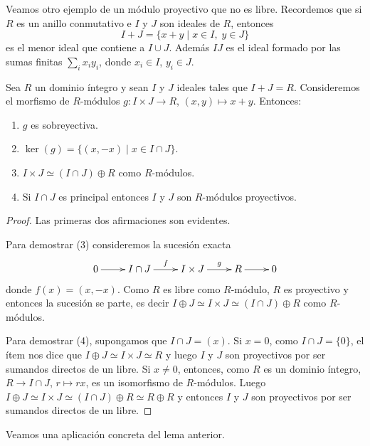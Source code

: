 Veamos otro ejemplo de un módulo proyectivo que no es libre. Recordemos
que si $R$ es un anillo conmutativo e $I$ y $J$ son ideales de $R$, entonces
	\[
		I+J=\{x+y\mid x\in I,\;y\in J\}
	\]
es el menor ideal que contiene a $I\cup J$. Además $IJ$ es el ideal formado
por las sumas finitas $\sum_i x_iy_i$, donde $x_i\in I$, $y_i\in J$. 

	\begin{lemma}
		Sea $R$ un dominio íntegro y sean $I$ y $J$ ideales tales que
		$I+J=R$. Consideremos el morfismo de $R$-módulos 
		$g\colon I\times J\to R$, $(x,y)\mapsto x+y$. 
		Entonces:
		\begin{enumerate}
			\item $g$ es sobreyectiva.
			\item $\ker(g)=\{(x,-x)\mid x\in I\cap J\}$.
			\item $I\times J\simeq (I\cap J)\oplus R$ como $R$-módulos.
			\item Si $I\cap J$ es principal entonces $I$ y $J$ son $R$-módulos
				proyectivos.
		\end{enumerate}
	\end{lemma}

	\begin{proof}
		Las primeras dos afirmaciones son evidentes. 
		
		Para demostrar (3) consideremos la sucesión exacta
		\[
		\xymatrix{
		0\ar[r] 
		& I\cap J
		\ar[r]^-{f}
		& I\times J
		\ar[r]^-{g}
		& R\ar[r]
		& 0
		}
		\]
		donde $f(x)=(x,-x)$. Como $R$ es libre como $R$-módulo, $R$ es proyectivo 
		y entonces la sucesión se parte, es decir $I\oplus J\simeq 
		I\times J\simeq (I\cap J)\oplus R$
		como $R$-módulos. 
		
		Para demostrar (4), supongamos que $I\cap
		J=(x)$. Si $x=0$, como $I\cap J=\{0\}$, el 
		ítem nos dice que $I\oplus J\simeq I\times J\simeq R$ y 
		luego $I$ y $J$ son proyectivos por ser sumandos directos de un libre.  
		Si $x\ne 0$, entonces, como $R$ es un dominio íntegro, $R\to I\cap J$, $r\mapsto rx$, es un isomorfismo de
		$R$-módulos. Luego 
		$I\oplus J\simeq I\times J\simeq (I\cap J)\oplus R\simeq R\oplus R$ y entonces 
		$I$ y $J$ son proyectivos por ser sumandos directos de
		un libre.
	\end{proof}

Veamos una aplicación concreta del lema anterior.  

